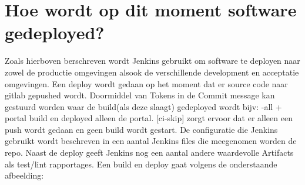 \section{Hoe wordt op dit moment software gedeployed?}
Zoals hierboven berschreven wordt Jenkins gebruikt om software te deployen naar zowel de productie omgevingen alsook de verschillende development en acceptatie omgevingen. Een deploy wordt gedaan op het moment dat er source code naar gitlab gepushed wordt. Doormiddel van Tokens in de Commit message kan gestuurd worden waar de build(als deze slaagt) gedeployed wordt bijv: {-all + portal} build en deployed alleen de portal. [ci-skip] zorgt ervoor dat er alleen een push wordt gedaan en geen build wordt gestart.
De configuratie die Jenkins gebruikt wordt beschreven in een aantal Jenkins files die meegenomen worden de repo. Naast de deploy geeft Jenkins nog een aantal andere waardevolle Artifacts als test/lint rapportages.
Een build en deploy gaat volgens de onderstaande afbeelding:

